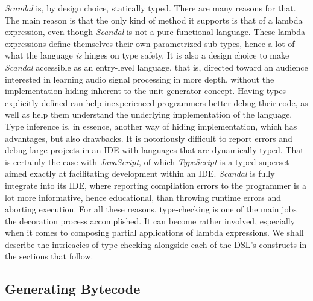 \emph{Scandal} is, by design choice, statically typed. There are many reasons for that. The main reason is that the only kind of method it supports is that of a lambda expression, even though \emph{Scandal} is not a pure functional language. These lambda expressions define themselves their own parametrized sub-types, hence a lot of what the language \emph{is} hinges on type safety. It is also a design choice to make \emph{Scandal} accessible as an entry-level language, that is, directed toward an audience interested in learning audio signal processing in more depth, without the implementation hiding inherent to the unit-generator concept. Having types explicitly defined can help inexperienced programmers better debug their code, as well as help them understand the underlying implementation of the language. Type inference is, in essence, another way of hiding implementation, which has advantages, but also drawbacks. It is notoriously difficult to report errors and debug large projects in an IDE with languages that are dynamically typed. That is certainly the case with \emph{JavaScript}, of which \emph{TypeScript} is a typed superset aimed exactly at facilitating development within an IDE. \emph{Scandal} is fully integrate into its IDE, where reporting compilation errors to the programmer is a lot more informative, hence educational, than throwing runtime errors and aborting execution. For all these reasons, type-checking is one of the main jobs the decoration process accomplished. It can become rather involved, especially when it comes to composing partial applications of lambda expressions. We shall describe the intricacies of type checking alongside each of the DSL's constructs in the sections that follow.

\subsection{Generating Bytecode}


